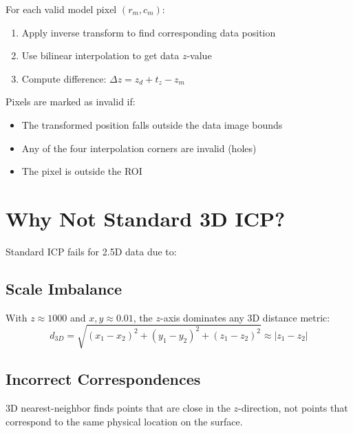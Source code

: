 \documentclass[11pt,a4paper]{article}
\begin{document}
For each valid model pixel $(r_m, c_m)$:
\begin{enumerate}
    \item Apply inverse transform to find corresponding data position
    \item Use bilinear interpolation to get data $z$-value
    \item Compute difference: $\Delta z = z_d + t_z - z_m$
\end{enumerate}

Pixels are marked as invalid if:
\begin{itemize}
    \item The transformed position falls outside the data image bounds
    \item Any of the four interpolation corners are invalid (holes)
    \item The pixel is outside the ROI
\end{itemize}

\section{Why Not Standard 3D ICP?}

Standard ICP fails for 2.5D data due to:

\subsection{Scale Imbalance}
With $z \approx 1000$ and $x, y \approx 0.01$, the $z$-axis dominates any 3D distance metric:
\begin{equation}
d_{3D} = \sqrt{(x_1-x_2)^2 + (y_1-y_2)^2 + (z_1-z_2)^2} \approx |z_1 - z_2|
\end{equation}

\subsection{Incorrect Correspondences}
3D nearest-neighbor finds points that are close in the $z$-direction, not points that correspond to the same physical location on the surface.
\end{document}
